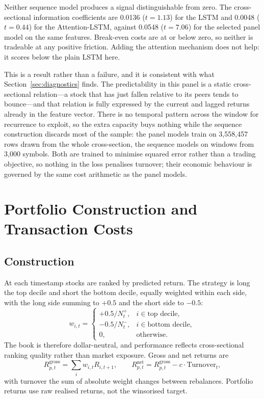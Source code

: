 \documentclass[11pt]{article}
\begin{document}
Neither sequence model produces a signal distinguishable from zero. The cross-sectional information coefficients are 0.0136 ($t = 1.13$) for the LSTM and 0.0048 ($t = 0.44$) for the Attention-LSTM, against 0.0548 ($t = 7.06$) for the selected panel model on the same features. Break-even costs are at or below zero, so neither is tradeable at any positive friction. Adding the attention mechanism does not help: it scores below the plain LSTM here.

This is a result rather than a failure, and it is consistent with what Section~\ref{sec:diagnostics} finds. The predictability in this panel is a static cross-sectional relation---a stock that has just fallen relative to its peers tends to bounce---and that relation is fully expressed by the current and lagged returns already in the feature vector. There is no temporal pattern across the window for recurrence to exploit, so the extra capacity buys nothing while the sequence construction discards most of the sample: the panel models train on 3,558,457 rows drawn from the whole cross-section, the sequence models on windows from 3,000 symbols. Both are trained to minimise squared error rather than a trading objective, so nothing in the loss penalises turnover; their economic behaviour is governed by the same cost arithmetic as the panel models.


\FloatBarrier
\section{Portfolio Construction and Transaction Costs}

\subsection{Construction}

At each timestamp stocks are ranked by predicted return. The strategy is long
the top decile and short the bottom decile, equally weighted within each side,
with the long side summing to $+0.5$ and the short side to $-0.5$:
\[
w_{i,t} =
\begin{cases}
+0.5/N_t^{+}, & i \in \text{top decile},\\
-0.5/N_t^{-}, & i \in \text{bottom decile},\\
0, & \text{otherwise.}
\end{cases}
\]
The book is therefore dollar-neutral, and performance reflects cross-sectional
ranking quality rather than market exposure. Gross and net returns are
\[
R^{\text{gross}}_{p,t} = \sum_i w_{i,t} R_{i,t+1},
\qquad
R^{\text{net}}_{p,t} = R^{\text{gross}}_{p,t} - c \cdot \text{Turnover}_t ,
\]
with turnover the sum of absolute weight changes between rebalances. Portfolio
returns use raw realised returns, not the winsorised target.
\end{document}

